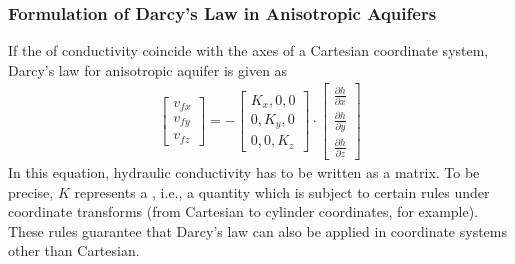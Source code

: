 \documentclass[letterpaper,10pt,english]{sphinxmanual}
\begin{document}
\subsubsection{Formulation of Darcy’s Law in Anisotropic Aquifers}
\label{\detokenize{contents/flow/lecture_06/16_darcy_law_3D:formulation-of-darcy-s-law-in-anisotropic-aquifers}}
If the  of conductivity coincide with the axes of a Cartesian coordinate system, Darcy’s law for anisotropic aquifer is given as
\begin{equation*}
\begin{split}
\begin{bmatrix}
v_{fx}\\ v_{fy}\\ v_{fz}
\end{bmatrix}
= -\begin{bmatrix}
K_x, 0,  0 \\
0, K_y, 0\\
0, 0, K_z
\end{bmatrix}
\cdot
\begin{bmatrix}
\frac{\partial h}{\partial x}\\ \frac{\partial h}{\partial y} \\ \frac{\partial h}{\partial z}
\end{bmatrix}
\end{split}
\end{equation*}
In this equation, hydraulic conductivity has to be written as a matrix. To be precise, \(K\) represents a , i.e., a quantity which is subject to certain rules under coordinate transforms (from Cartesian to cylinder coordinates, for example). These rules guarantee that Darcy’s law can also be applied in coordinate systems other than Cartesian.
\end{document}
